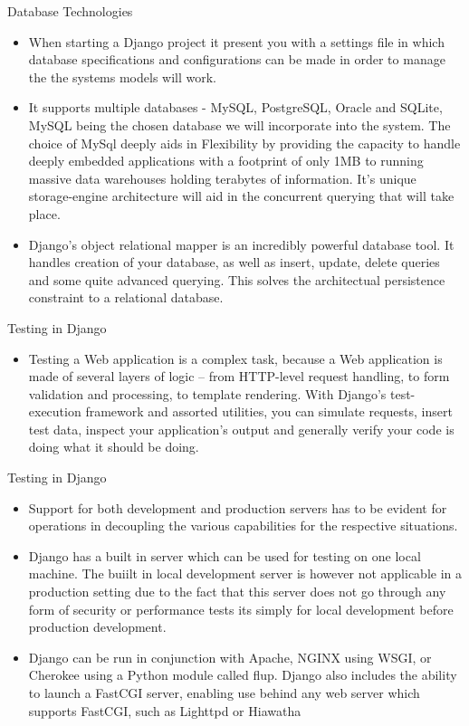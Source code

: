 \documentclass[12pt]{article}
\begin{document}
					 Database Technologies
					\begin{itemize}
						\item When starting a Django project it present you with a settings file in which database specifications and configurations can be made in order to manage the the systems models will work.
						\item It supports multiple databases - MySQL, PostgreSQL, Oracle and SQLite, MySQL being the chosen database we will incorporate into the system. The choice of MySql deeply aids in Flexibility by providing the capacity to handle deeply embedded applications with a footprint of only 1MB to running massive data warehouses holding terabytes of information. It's unique storage-engine architecture will aid in the concurrent querying that will take place.
						\item Django's object relational mapper is an incredibly powerful database tool. It handles creation of your database, as well as insert, update, delete queries and some quite advanced querying. This solves the architectual persistence constraint to a relational database.
						
					\end{itemize}
					 
					 Testing in Django
					\begin{itemize}
						\item Testing a Web application is a complex task, because a Web application is made of several layers of logic – from HTTP-level request handling, to form validation and processing, to template rendering. With Django’s test-execution framework and assorted utilities, you can simulate requests, insert test data, inspect your application’s output and generally verify your code is doing what it should be doing.
						
					\end{itemize}
					
					 Testing in Django 
					\begin{itemize}
						\item Support for both development and production servers has to be evident for operations in decoupling the various capabilities for the respective situations. 
						\item Django has a built in server which can be used for testing on one local machine. The buiilt in local development server is however not applicable in a production setting due to the fact that this server does not go through any form of security or performance tests its simply for local development before production development.
						\item Django can be run in conjunction with Apache, NGINX using WSGI, or Cherokee using a Python module called flup. Django also includes the ability to launch a FastCGI server, enabling use behind any web server which supports FastCGI, such as Lighttpd or Hiawatha
					\end{itemize}
		
\end{document}
